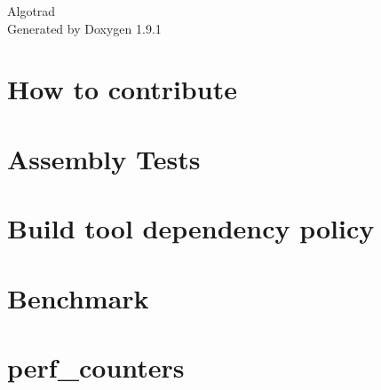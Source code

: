 \let\mypdfximage\pdfximage\def\pdfximage{\immediate\mypdfximage}\documentclass[twoside]{book}
\newcommand{\+}{\discretionary{\mbox{\scriptsize$\hookleftarrow$}}{}{}}
\newcommand{\clearemptydoublepage}{%
  \newpage{\pagestyle{empty}\cleardoublepage}%
}
\begin{document}
\raggedbottom

\hypersetup{pageanchor=false,
             bookmarksnumbered=true,
             pdfencoding=unicode
            }
\begin{titlepage}
\vspace*{7cm}
\begin{center}%
{\Large Algotrad }\\
\vspace*{1cm}
{\large Generated by Doxygen 1.9.1}\\
\end{center}
\end{titlepage}
\clearemptydoublepage
{}
\tableofcontents
\clearemptydoublepage
{}
\hypersetup{pageanchor=true}

\chapter{How to contribute}
\label{md_build__deps_googlebenchmark_src_CONTRIBUTING}

\chapter{Assembly Tests}
\label{md_build__deps_googlebenchmark_src_docs_AssemblyTests}

\chapter{Build tool dependency policy}
\label{md_build__deps_googlebenchmark_src_docs_dependencies}

\chapter{Benchmark}
\label{md_build__deps_googlebenchmark_src_docs_index}

\chapter{perf\+\_\+counters}
\label{md_build__deps_googlebenchmark_src_docs_perf_counters}

\end{document}
